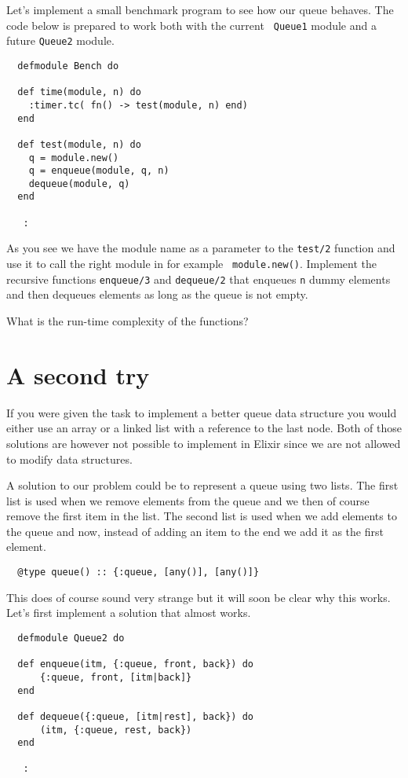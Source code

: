\documentclass[a4paper,11pt]{article}
\begin{document}
Let's implement a small benchmark program to see how our queue
behaves. The code below is prepared to work both with the current {\tt
  Queue1} module and a future {\tt Queue2} module.

\begin{verbatim}
  defmodule Bench do

  def time(module, n) do
    :timer.tc( fn() -> test(module, n) end)
  end

  def test(module, n) do
    q = module.new()
    q = enqueue(module, q, n)
    dequeue(module, q)
  end

   :
\end{verbatim}

As you see we have the module name as a parameter to the {\tt test/2}
function and use it to call the right module in for example {\tt
  module.new()}.  Implement the recursive functions {\tt enqueue/3}
and {\tt dequeue/2} that enqueues {\tt n} dummy elements and then
dequeues elements as long as the queue is not empty.

What is the run-time complexity of the functions?


\section*{A second try}

If you were given the task to implement a better queue data structure
you would either use an array or a linked list with a reference to the
last node. Both of those solutions are however not possible to
implement in Elixir since we are not allowed to modify data structures.

A solution to our problem could be to represent a queue using two
lists. The first list is used when we remove elements from the queue
and we then of course remove the first item in the list. The second
list is used when we add elements to the queue and now, instead of
adding an item to the end we add it as the first element.

\begin{verbatim}
  @type queue() :: {:queue, [any()], [any()]}
\end{verbatim}

This does of course sound very strange but it will soon be clear why
this works. Let's first implement a solution that almost works.

\begin{verbatim}
  defmodule Queue2 do

  def enqueue(itm, {:queue, front, back}) do
      {:queue, front, [itm|back]}
  end
  
  def dequeue({:queue, [itm|rest], back}) do
      (itm, {:queue, rest, back})
  end
  
   :

 \end{verbatim}
\end{document}
